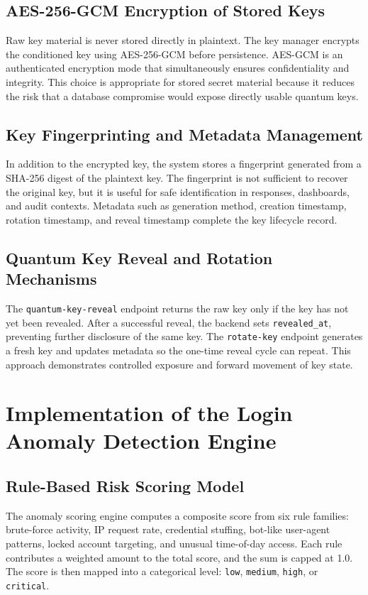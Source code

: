 \subsection{AES-256-GCM Encryption of Stored Keys}
Raw key material is never stored directly in plaintext. The key manager encrypts the conditioned key using AES-256-GCM before persistence. AES-GCM is an authenticated encryption mode that simultaneously ensures confidentiality and integrity. This choice is appropriate for stored secret material because it reduces the risk that a database compromise would expose directly usable quantum keys.

\subsection{Key Fingerprinting and Metadata Management}
In addition to the encrypted key, the system stores a fingerprint generated from a SHA-256 digest of the plaintext key. The fingerprint is not sufficient to recover the original key, but it is useful for safe identification in responses, dashboards, and audit contexts. Metadata such as generation method, creation timestamp, rotation timestamp, and reveal timestamp complete the key lifecycle record.

\subsection{Quantum Key Reveal and Rotation Mechanisms}
The \texttt{quantum-key-reveal} endpoint returns the raw key only if the key has not yet been revealed. After a successful reveal, the backend sets \texttt{revealed\_at}, preventing further disclosure of the same key. The \texttt{rotate-key} endpoint generates a fresh key and updates metadata so the one-time reveal cycle can repeat. This approach demonstrates controlled exposure and forward movement of key state.

\section{Implementation of the Login Anomaly Detection Engine}

\subsection{Rule-Based Risk Scoring Model}
The anomaly scoring engine computes a composite score from six rule families: brute-force activity, IP request rate, credential stuffing, bot-like user-agent patterns, locked account targeting, and unusual time-of-day access. Each rule contributes a weighted amount to the total score, and the sum is capped at 1.0. The score is then mapped into a categorical level: \texttt{low}, \texttt{medium}, \texttt{high}, or \texttt{critical}.

